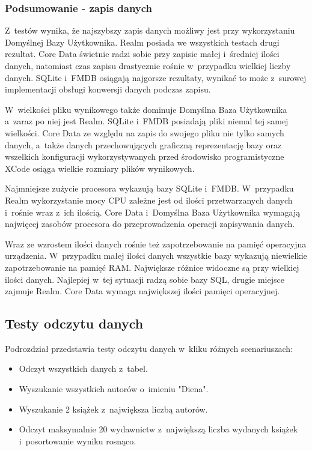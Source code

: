 \subsubsection{Podsumowanie - zapis danych}

 Z~testów wynika, że najszybszy zapis danych możliwy jest przy wykorzystaniu Domyślnej Bazy Użytkownika. Realm posiada we wszystkich testach drugi rezultat. Core Data świetnie radzi sobie przy zapisie małej i~średniej ilości danych, natomiast czas zapisu drastycznie rośnie w~przypadku wielkiej liczby danych. SQLite i~FMDB osiągają najgorsze rezultaty, wynikać to może z~surowej implementacji obsługi konwersji danych podczas zapisu. 

 W~wielkości pliku wynikowego także dominuje Domyślna Baza Użytkownika a~zaraz po niej jest Realm. SQLite i~FMDB posiadają pliki niemal tej samej wielkości. Core Data ze względu na zapis do swojego pliku nie tylko samych danych, a~także danych przechowujących graficzną reprezentację bazy oraz wszelkich konfiguracji wykorzystywanych przed środowisko programistyczne XCode osiąga wielkie rozmiary plików wynikowych. 

Najmniejsze zużycie procesora wykazują bazy SQLite i~FMDB. W~przypadku Realm wykorzystanie mocy CPU zależne jest od ilości przetwarzanych danych i~rośnie wraz z~ich ilością. Core Data i~Domyślna Baza Użytkownika wymagają najwięcej zasobów procesora do przeprowadzenia operacji zapisywania danych. 

Wraz ze wzrostem ilości danych rośnie też zapotrzebowanie na pamięć operacyjna urządzenia. W~przypadku małej ilości danych wszystkie bazy wykazują niewielkie zapotrzebowanie na pamięć RAM. Największe różnice widoczne są przy wielkiej ilości danych. Najlepiej w~tej sytuacji radzą sobie bazy SQL, drugie miejsce zajmuje Realm. Core Data wymaga największej  ilości pamięci operacyjnej. 

\subsection{Testy odczytu danych}

Podrozdział przedstawia testy odczytu danych w~kliku różnych scenariuszach: 

\begin{itemize}
\item Odczyt wszystkich danych z~tabel.
\item Wyszukanie wszystkich autorów o~imieniu "Diena".
\item Wyszukanie 2 książek z~największa liczbą autorów.
\item Odczyt maksymalnie 20 wydawnictw z~największą liczba wydanych książek i~posortowanie wyniku rosnąco.
\end{itemize}

